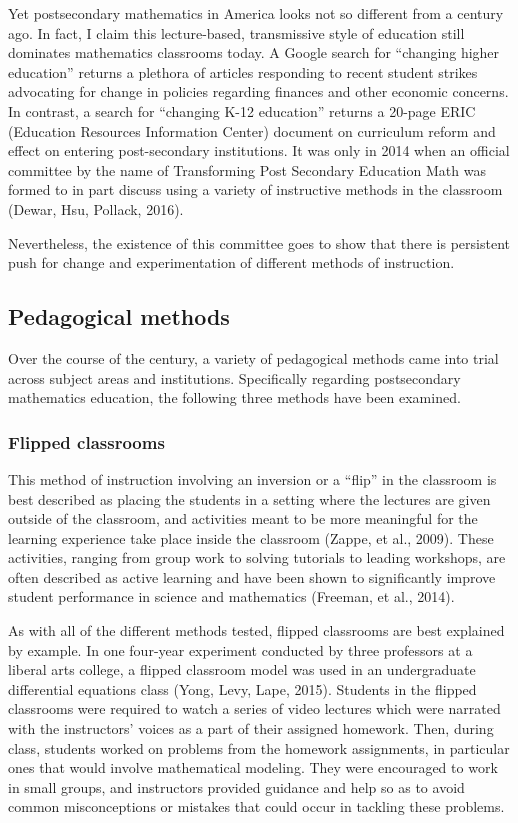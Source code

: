 Yet postsecondary mathematics in America looks not so different from a century ago. In fact, I claim this lecture-based, transmissive style of education still dominates mathematics classrooms today. A Google search for ``changing higher education'' returns a plethora of articles responding to recent student strikes advocating for change in policies regarding finances and other economic concerns. In contrast, a search for ``changing K-12 education'' returns a 20-page ERIC (Education Resources Information Center) document on curriculum reform and effect on entering post-secondary institutions. It was only in 2014 when an official committee by the name of Transforming Post Secondary Education Math was formed to in part discuss using a variety of instructive methods in the classroom (Dewar, Hsu, Pollack, 2016).

Nevertheless, the existence of this committee goes to show that there is persistent push for change and experimentation of different methods of instruction.
\subsection{Pedagogical methods}
Over the course of the century, a variety of pedagogical methods came into trial across subject areas and institutions. Specifically regarding postsecondary mathematics education, the following three methods have been examined.

\subsubsection{Flipped classrooms}
This method of instruction involving an inversion or a ``flip'' in the classroom is best described as placing the students in a setting where the lectures are given outside of the classroom, and activities meant to be more meaningful for the learning experience take place inside the classroom (Zappe, et al., 2009). These activities, ranging from group work to solving tutorials to leading workshops, are often described as active learning and have been shown to significantly improve student performance in science and mathematics (Freeman, et al., 2014).

As with all of the different methods tested, flipped classrooms are best explained by example. In one four-year experiment conducted by three professors at a liberal arts college, a flipped classroom model was used in an undergraduate differential equations class (Yong, Levy, Lape, 2015). Students in the flipped classrooms were required to watch a series of video lectures which were narrated with the instructors' voices as a part of their assigned homework. Then, during class, students worked on problems from the homework assignments, in particular ones that would involve mathematical modeling. They were encouraged to work in small groups, and instructors provided guidance and help so as to avoid common misconceptions or mistakes that could occur in tackling these problems.

